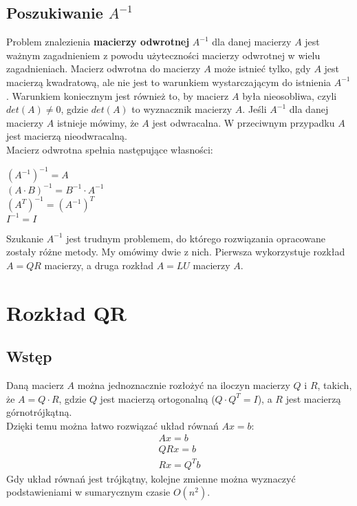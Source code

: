 \documentclass[11pt]{article}
\begin{document}
\subsection{Poszukiwanie $A^{-1}$}

Problem znalezienia \textbf{macierzy odwrotnej} $A^{-1}$ dla danej macierzy $A$ jest ważnym zagadnieniem z powodu użyteczności macierzy odwrotnej w wielu zagadnieniach. Macierz odwrotna do macierzy $A$ może istnieć tylko, gdy $A$ jest macierzą kwadratową, ale nie jest to warunkiem wystarczającym do istnienia $A^{-1}$. Warunkiem koniecznym jest również to, by macierz $A$ była nieosobliwa, czyli $det(A) \neq 0$, gdzie $det(A)$ to wyznacznik macierzy $A$. Jeśli $A^{-1}$ dla danej macierzy $A$ istnieje mówimy, że $A$ jest odwracalna. W przeciwnym przypadku $A$ jest macierzą nieodwracalną.\\
Macierz odwrotna spełnia następujące własności:
\begin{center}
$(A^{-1})^{-1} = A$\\
\vspace{0.3em} $(A \cdot B)^{-1} = B^{-1} \cdot A^{-1}$\\
\vspace{0.3em} $(A^{T})^{-1} = (A^{-1})^{T}$\\
\vspace{0.3em} $I^{-1} = I$
\end{center}

Szukanie $A^{-1}$ jest trudnym problemem, do którego rozwiązania opracowane zostały różne metody. My omówimy dwie z nich. Pierwsza wykorzystuje rozkład $A = QR$ macierzy, a druga rozkład $A = LU$ macierzy $A$.

\section{Rozkład QR}
\subsection{Wstęp}
Daną macierz $A$ można jednoznacznie rozłożyć na iloczyn macierzy $Q$ i $R$, takich, że $A=Q \cdot R$, gdzie $Q$ jest macierzą ortogonalną ($Q \cdot Q^{T} = I$), a $R$ jest macierzą górnotrójkątną. \\
Dzięki temu można łatwo rozwiązać układ równań $Ax=b$:
\begin{align*}
Ax=b \\
QRx=b \\
Rx = Q^Tb
\end{align*}
Gdy układ równań jest trójkątny, kolejne zmienne można wyznaczyć podstawieniami w sumarycznym czasie $O(n^2)$.\\
\end{document}
